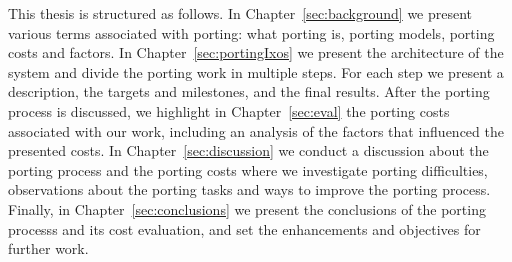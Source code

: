 This thesis is structured as follows. In Chapter~\ref{sec:background} we present
various terms associated with porting: what porting is, porting models, porting
costs and factors. In Chapter~\ref{sec:portingIxos} we present the architecture
of the system and divide the porting work in multiple steps. For each step we
present a description, the targets and milestones, and the final results. After
the porting process is discussed, we highlight in Chapter~\ref{sec:eval} the
porting costs associated with our work, including an analysis of the factors
that influenced the presented costs. In Chapter~\ref{sec:discussion} we
conduct a discussion about the porting process and the porting costs where we
investigate porting difficulties, observations about the porting tasks and ways
to improve the porting process. Finally, in Chapter~\ref{sec:conclusions} we
present the conclusions of the porting processs and its cost evaluation, and set
the enhancements and objectives for further work.
